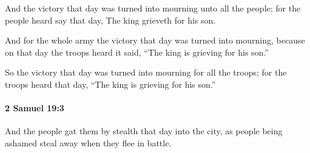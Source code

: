 			\begin{versebox}
					\item[BHS] 
					\item[ASV] And the victory that day was turned into mourning unto all the people; for the people heard say that day, The king grieveth for his son.
					\item[NIV] And for the whole army the victory that day was turned into mourning, because on that day the troops heard it said, “The king is grieving for his son.”
					\item[NRSV] So the victory that day was turned into mourning for all the troops; for the troops heard that day, “The king is grieving for his son.”
			\end{versebox}

		\paragraph{2 Samuel 19:3} %
			\label{2SAMUEL-19-3}

			And the people gat them by stealth that day into the city, as people being ashamed steal away when they flee in battle.

